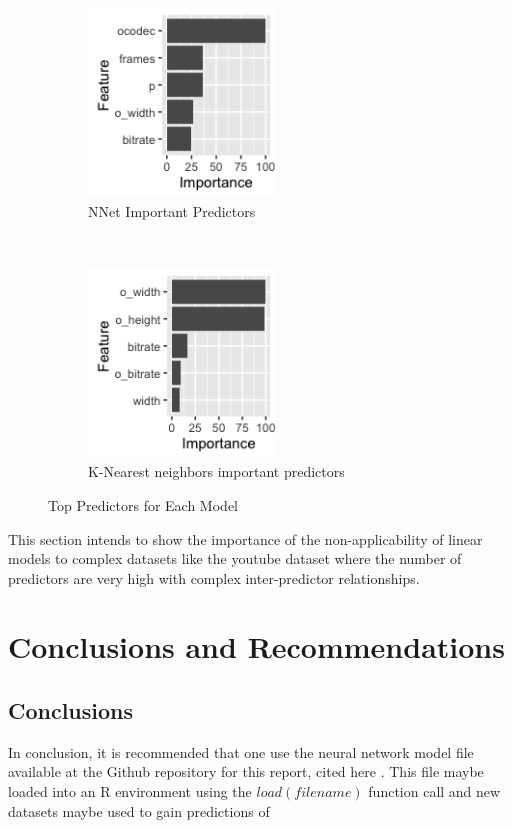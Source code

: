 \documentclass[letterpaper,12pt,titlepage,oneside,final]{report}
\begin{document}
            \begin{figure}[!ht]
            \begin{subfigure}[t]{0.5\textwidth}
                \centering
                \includegraphics[height=5cm]{nnetvarimp}
                \caption{NNet Important Predictors}
                \label{nnetvarimp}
            \end{subfigure}%
                ~ 
            \begin{subfigure}[t]{0.5\textwidth}
                \centering
                \includegraphics[height=5cm]{knnvarimp}
                \caption{K-Nearest neighbors important predictors}
                \label{knnvarimp}
            \end{subfigure}
            \caption{Top Predictors for Each Model}
            \end{figure}
            This section intends to show the importance of the non-applicability of linear models to complex datasets like the youtube dataset where the number of predictors are very high with complex inter-predictor relationships.

\chapter{Conclusions and Recommendations}
    \section{Conclusions}
        In conclusion, it is recommended that one use the neural network model file available at the Github repository for this report, cited here \cite{prajn0:online}. This file maybe loaded into an R environment using the $load(filename)$ function call and new datasets maybe used to gain predictions of 
\end{document}
